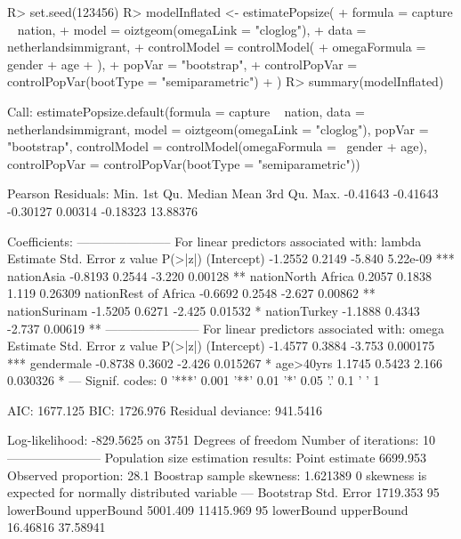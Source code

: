 \documentclass[nojss]{jss}
\newcommand{\1}{\mathcal{I}} \newcommand{\bZero}{\boldsymbol{0}}
\begin{document}
\begin{CodeChunk}
\begin{CodeInput}
R> set.seed(123456)
R> modelInflated <- estimatePopsize(
+     formula = capture ~ nation,
+     model   = oiztgeom(omegaLink = "cloglog"),
+     data    = netherlandsimmigrant,
+     controlModel = controlModel(
+         omegaFormula = ~ gender + age
+     ),
+     popVar = "bootstrap",
+     controlPopVar = controlPopVar(bootType = "semiparametric")
+ )
R> summary(modelInflated)
\end{CodeInput}
\begin{CodeOutput}

Call:
estimatePopsize.default(formula = capture ~ nation, data = netherlandsimmigrant,
    model = oiztgeom(omegaLink = "cloglog"), popVar = "bootstrap",
    controlModel = controlModel(omegaFormula = ~gender + age),
    controlPopVar = controlPopVar(bootType = "semiparametric"))

Pearson Residuals:
    Min.  1st Qu.   Median     Mean  3rd Qu.     Max.
-0.41643 -0.41643 -0.30127  0.00314 -0.18323 13.88376

Coefficients:
-----------------------
For linear predictors associated with: lambda
                     Estimate Std. Error z value  P(>|z|)
(Intercept)           -1.2552     0.2149  -5.840 5.22e-09 ***
nationAsia            -0.8193     0.2544  -3.220  0.00128 **
nationNorth Africa     0.2057     0.1838   1.119  0.26309
nationRest of Africa  -0.6692     0.2548  -2.627  0.00862 **
nationSurinam         -1.5205     0.6271  -2.425  0.01532 *
nationTurkey          -1.1888     0.4343  -2.737  0.00619 **
-----------------------
For linear predictors associated with: omega
            Estimate Std. Error z value  P(>|z|)
(Intercept)  -1.4577     0.3884  -3.753 0.000175 ***
gendermale   -0.8738     0.3602  -2.426 0.015267 *
age>40yrs     1.1745     0.5423   2.166 0.030326 *
---
Signif. codes:  0 '***' 0.001 '**' 0.01 '*' 0.05 '.' 0.1 ' ' 1

AIC: 1677.125
BIC: 1726.976
Residual deviance: 941.5416

Log-likelihood: -829.5625 on 3751 Degrees of freedom
Number of iterations: 10
-----------------------
Population size estimation results:
Point estimate 6699.953
Observed proportion: 28.1%
Boostrap sample skewness: 1.621389
0 skewness is expected for normally distributed variable
---
Bootstrap Std. Error 1719.353
95%
lowerBound upperBound
  5001.409  11415.969
95%
lowerBound upperBound
  16.46816   37.58941
\end{CodeOutput}
\end{CodeChunk}
\end{document}
